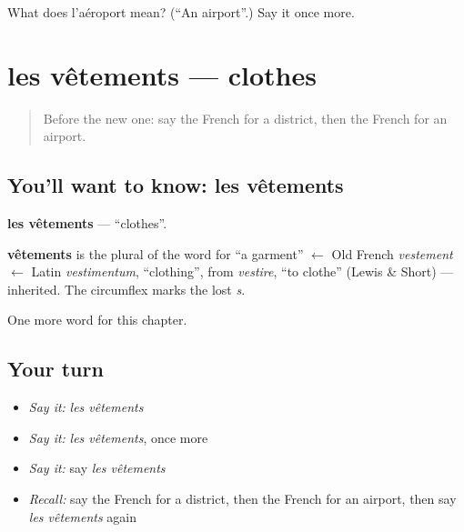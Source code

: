 \begin{tcolorbox}[breakable,colback=teal!4,colframe=teal!35!black,title={Before you move on}]
What does l'aéroport mean? (\textquotedblleft{}An airport\textquotedblright{}.) Say it once more.
\end{tcolorbox}
\section[les vêtements]{les vêtements — clothes}

\label{lesson:FR-C103-vetements}



\begin{quote}
Before the new one: say the French for a district, then the French for an airport.
\end{quote}

\subsection*{You'll want to know: les vêtements}
\textbf{les vêtements} — \textquotedblleft{}clothes\textquotedblright{}.

\begin{cousinweb}
\textbf{vêtements} is the plural of the word for \textquotedblleft{}a garment\textquotedblright{} $\leftarrow$ Old French \emph{vestement} $\leftarrow$ Latin \emph{vestimentum}, \textquotedblleft{}clothing\textquotedblright{}, from \emph{vestire}, \textquotedblleft{}to clothe\textquotedblright{} (Lewis \& Short) — inherited. The circumflex marks the lost \emph{s}.
\end{cousinweb}

\begin{grammarlens}[title={What you've built}]
One more word for this chapter.
\end{grammarlens}

\subsection*{Your turn}
\begin{itemize}
\raggedright
  \item \emph{Say it:} \emph{les vêtements}
  \item \emph{Say it:} \emph{les vêtements}, once more
  \item \emph{Say it:} say \emph{les vêtements}
  \item \emph{Recall:} say the French for a district, then the French for an airport, then say \emph{les vêtements} again
\end{itemize}

